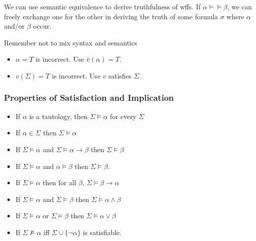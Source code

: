 We can use semantic equivalence to derive truthfulness of wffs. If $\alpha\vDash\models\beta$, we can freely exchange one for the other in deriving the truth of some formula $\sigma$ where $\alpha$ and/or $\beta$ occur.

Remember not to mix syntax and semantics

\begin{itemize}
    \item $\alpha=T$ is incorrect. Use $\bar{v}(\alpha)=T$.
    \item $v(\Sigma)=T$ is incorrect. Use $v$ satisfies $\Sigma$.
\end{itemize}

\subsubsection{Properties of Satisfaction and Implication}

\begin{itemize}
    \item If $\alpha$ is a tautology, then $\Sigma\vDash\alpha$ for every $\Sigma$
    \item If $\alpha\in\Sigma$ then $\Sigma\vDash\alpha$
    \item If $\Sigma\vDash\alpha$ and $\Sigma\vDash\alpha\to\beta$ then $\Sigma\vDash\beta$
    \item If $\Sigma\vDash\alpha$ and $\alpha\vDash\beta$ then $\Sigma\vDash\beta$.
    \item If $\Sigma\vDash\alpha$ then for all $\beta$, $\Sigma\vDash\beta\to\alpha$
    \item If $\Sigma\vDash\alpha$ and $\Sigma\vDash\beta$ then $\Sigma\vDash \alpha\wedge\beta$
    \item If $\Sigma\vDash\alpha$ or $\Sigma\vDash\beta$ then $\Sigma\vDash \alpha\vee\beta$
    \item If $\Sigma\nvDash\alpha$ iff $\Sigma\cup\{\neg\alpha\}$ is satisfiable.
\end{itemize}